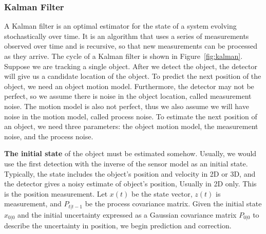 \subsubsection{Kalman Filter}
A Kalman filter is an optimal estimator for the state of a system evolving stochastically over time. It is an algorithm that uses a series of measurements observed over time and is recursive, so that new measurements can be processed as they arrive. The cycle of a Kalman filter is shown in Figure~\ref{fig:kalman}. Suppose we are tracking a single object. After we detect the object, the detector will give us a candidate location of the object. To predict the next position of the object, we need an object motion model. Furthermore, the detector may not be perfect, so  we assume there is noise in the object location, called measurement noise. The motion model is also not perfect, thus we also assume we will have noise in the motion model, called process noise. To estimate the next position of an object, we need three parameters: the object motion model, the measurement noise, and the process noise.

\textbf{The initial state} of the object must be estimated somehow. Usually, we would use the first detection with the inverse of the sensor model as an initial state. Typically, the state includes the object's position and velocity in 2D or 3D, and the detector gives a noisy estimate of object's position, Usually in 2D only. This is the position measurement. Let $x(t)$ be the state vector, $z(t)$ is measurement, and $P_{t|t-1}$ be the process covariance matrix. Given the initial state $x_{0|0}$ and the initial uncertainty expressed as a Gaussian covariance matrix $P_{0|0}$ to describe the uncertainty in position, we begin prediction and correction.

